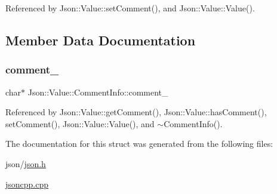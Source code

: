 Referenced by Json\+::\+Value\+::set\+Comment(), and Json\+::\+Value\+::\+Value().



\subsection{Member Data Documentation}
\mbox{\label{structJson_1_1Value_1_1CommentInfo_a020f19c7098bab8ec8fec14cd1a5afb9_a020f19c7098bab8ec8fec14cd1a5afb9}} 
\subsubsection{\texorpdfstring{comment\+\_\+}{comment\_}}
{\footnotesize\ttfamily char$\ast$ Json\+::\+Value\+::\+Comment\+Info\+::comment\+\_\+}



Referenced by Json\+::\+Value\+::get\+Comment(), Json\+::\+Value\+::has\+Comment(), set\+Comment(), Json\+::\+Value\+::\+Value(), and $\sim$\+Comment\+Info().



The documentation for this struct was generated from the following files\+:\begin{DoxyCompactItemize}
\item 
json/\hyperlink{json_8h}{json.\+h}\item 
\hyperlink{jsoncpp_8cpp}{jsoncpp.\+cpp}\end{DoxyCompactItemize}
